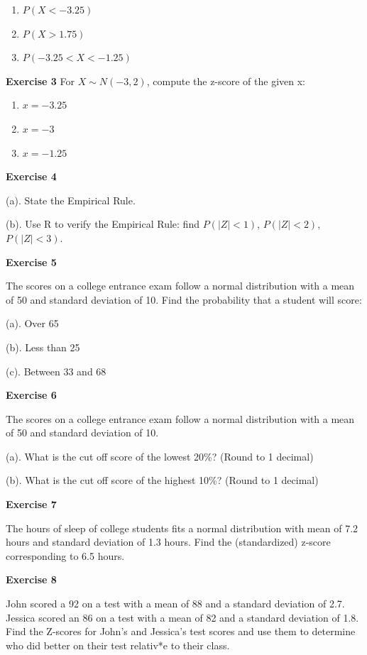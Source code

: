 \documentclass[
]{book}
\providecommand{\tightlist}{%
  \setlength{\itemsep}{0pt}\setlength{\parskip}{0pt}}
\begin{document}
\begin{enumerate}
\def\labelenumi{\arabic{enumi}.}
\tightlist
\item
  \(P(X < -3.25)\)
\item
  \(P(X > 1.75)\)
\item
  \(P(-3.25 < X < -1.25)\)
\end{enumerate}

\textbf{Exercise 3} For \(X \sim N(-3, 2)\), compute the z-score of the given x:

\begin{enumerate}
\def\labelenumi{\arabic{enumi}.}
\tightlist
\item
  \(x = -3.25\)
\item
  \(x = -3\)
\item
  \(x = -1.25\)
\end{enumerate}

\textbf{Exercise 4}

(a). State the Empirical Rule.

(b). Use R to verify the Empirical Rule: find \(P(|Z| < 1)\), \(P(|Z| < 2)\), \(P(|Z| < 3)\).

\textbf{Exercise 5}

The scores on a college entrance exam follow a normal distribution with a mean of 50 and standard deviation of 10. Find the probability that a student will score:

(a). Over 65

(b). Less than 25

(c). Between 33 and 68

\textbf{Exercise 6}

The scores on a college entrance exam follow a normal distribution with a mean of 50 and standard deviation of 10.

(a). What is the cut off score of the lowest 20\%? (Round to 1 decimal)

(b). What is the cut off score of the highest 10\%? (Round to 1 decimal)

\textbf{Exercise 7}

The hours of sleep of college students fits a normal distribution with mean of 7.2 hours and standard deviation of 1.3 hours. Find the (standardized) z-score corresponding to 6.5 hours.

\textbf{Exercise 8}

John scored a 92 on a test with a mean of 88 and a standard deviation of 2.7. Jessica scored an 86 on a test with a mean of 82 and a standard deviation of 1.8. Find the Z-scores for John's and Jessica's test scores and use them to determine who did better on their test relativ*e to their class.
\end{document}
